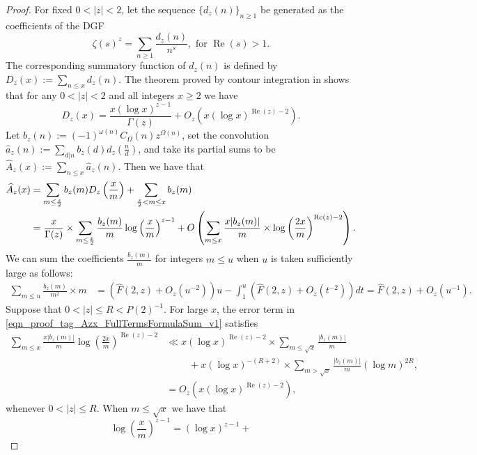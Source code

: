 \documentclass[11pt,reqno,a4letter]{article}
\numberwithin{equation}{section}
\numberwithin{figure}{section}
\numberwithin{table}{section}
\theoremstyle{plain}
\numberwithin{theorem}{section}
\theoremstyle{definition}
\renewcommand{\Re}{\operatorname{Re}}
\begin{document}
\begin{proof}
For fixed $0 < |z| < 2$, let the sequence $\{d_z(n)\}_{n \geq 1}$ be generated as the coefficients of the DGF 
$$\zeta(s)^{z} = \sum_{n \geq 1} \frac{d_z(n)}{n^s}, \text{ for } \Re(s) > 1.$$ The corresponding 
summatory function of $d_z(n)$ is defined by $D_z(x) := \sum\limits_{n \leq x} d_z(n)$. 
The theorem proved by contour integration in 
\cite[Thm.\ 7.17; \S 7.4]{MV} shows that for any $0 < |z| < 2$ 
and all integers $x \geq 2$ we have 
\[
D_z(x) = \frac{x (\log x)^{z-1}}{\Gamma(z)} + O_z\left(x (\log x)^{\Re(z)-2}\right). 
\]
Let 
$b_z(n) := (-1)^{\omega(n)} C_{\Omega}(n) z^{\Omega(n)}$, set the convolution 
$\hat{a}_z(n) := \sum\limits_{d|n} b_z(d) d_z\left(\frac{n}{d}\right)$, 
and take its partial sums to be  
$\widehat{A}_z(x) := \sum\limits_{n \leq x} \hat{a}_z(n)$. 
Then we have that 
\begin{align} 
\notag 
\widehat{A}_z(x) & = \sum_{m \leq \frac{x}{2}} b_z(m) D_z\left(\frac{x}{m}\right) + 
     \sum_{\frac{x}{2} < m \leq x} b_z(m) \\ 
\label{eqn_proof_tag_Azx_FullTermsFormulaSum_v1} 
     & = \frac{x}{\Gamma(z)} \times \sum_{m \leq \frac{x}{2}} 
     \frac{b_z(m)}{m} \log\left(\frac{x}{m}\right)^{z-1} + 
     O\left(\sum_{m \leq x} \frac{x |b_z(m)|}{m} \times
     \log\left(\frac{2x}{m}\right)^{\Re(z) - 2}\right). 
\end{align} 
We can sum the coefficients $\frac{b_z(m)}{m}$ 
for integers $m \leq u$ when $u$ is taken sufficiently large as follows: 
\begin{align*} 
\sum_{m \leq u} \frac{b_z(m)}{m^2} \times m & = \left(\widehat{F}(2, z) + 
     O_z\left(u^{-2}\right)\right) u - \int_1^{u} 
     \left(\widehat{F}(2, z) + O_z\left(t^{-2}\right)\right) dt 
     = \widehat{F}(2, z) + O_z\left(u^{-1}\right). 
\end{align*} 
Suppose that $0 < |z| \leq R < P(2)^{-1}$. 
For large $x$, the error term in \eqref{eqn_proof_tag_Azx_FullTermsFormulaSum_v1} satisfies 
\begin{align*} 
\sum_{m \leq x} \frac{x |b_z(m)|}{m} 
     \log\left(\frac{2x}{m}\right)^{\Re(z) - 2} & \ll 
     x (\log x)^{\Re(z) - 2} \times \sum_{m \leq \sqrt{x}} \frac{|b_z(m)|}{m} \\ 
     & \phantom{\ll x\ } + 
     x (\log x)^{-(R+2)} \times \sum_{m > \sqrt{x}} \frac{|b_z(m)|}{m} (\log m)^{2R}, \\ 
     & = O_z\left(x (\log x)^{\Re(z) - 2}\right), 
\end{align*} 
whenever $0 < |z| \leq R$. 
When $m \leq \sqrt{x}$ we have that 
\[
\log\left(\frac{x}{m}\right)^{z-1} = (\log x)^{z-1} + 
\]
\end{proof}
\end{document}
